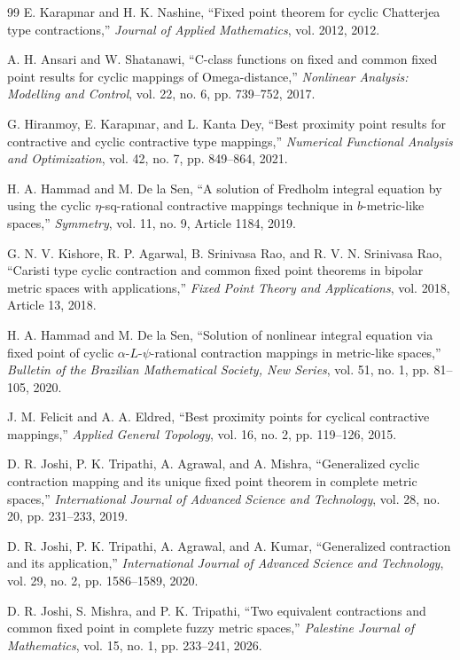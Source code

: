 \documentclass[11pt,a4paper,margin=1in]{amsart}
\theoremstyle{plain}
\theoremstyle{definition}
\theoremstyle{remark}
\begin{document}
\begin{thebibliography}{99}
E. Karapınar and H. K. Nashine,
``Fixed point theorem for cyclic Chatterjea type contractions,''
\emph{Journal of Applied Mathematics}, vol. 2012, 2012.

A. H. Ansari and W. Shatanawi,
``C-class functions on fixed and common fixed point results for cyclic mappings
of Omega-distance,''
\emph{Nonlinear Analysis: Modelling and Control}, vol. 22, no. 6,
pp. 739--752, 2017.

G. Hiranmoy, E. Karapınar, and L. Kanta Dey,
``Best proximity point results for contractive and cyclic contractive type mappings,''
\emph{Numerical Functional Analysis and Optimization}, vol. 42, no. 7,
pp. 849--864, 2021.

H. A. Hammad and M. De la Sen,
``A solution of Fredholm integral equation by using the cyclic
$\eta$-sq-rational contractive mappings technique in $b$-metric-like spaces,''
\emph{Symmetry}, vol. 11, no. 9, Article 1184, 2019.

G. N. V. Kishore, R. P. Agarwal, B. Srinivasa Rao, and R. V. N. Srinivasa Rao,
``Caristi type cyclic contraction and common fixed point theorems in bipolar
metric spaces with applications,''
\emph{Fixed Point Theory and Applications}, vol. 2018,
Article 13, 2018.

H. A. Hammad and M. De la Sen,
``Solution of nonlinear integral equation via fixed point of cyclic
$\alpha$-$L$-$\psi$-rational contraction mappings in metric-like spaces,''
\emph{Bulletin of the Brazilian Mathematical Society, New Series},
vol. 51, no. 1, pp. 81--105, 2020.

J. M. Felicit and A. A. Eldred,
``Best proximity points for cyclical contractive mappings,''
\emph{Applied General Topology}, vol. 16, no. 2,
pp. 119--126, 2015.

D. R. Joshi, P. K. Tripathi, A. Agrawal, and A. Mishra,
``Generalized cyclic contraction mapping and its unique fixed point theorem
in complete metric spaces,''
\emph{International Journal of Advanced Science and Technology},
vol. 28, no. 20, pp. 231--233, 2019.

D. R. Joshi, P. K. Tripathi, A. Agrawal, and A. Kumar,
``Generalized contraction and its application,''
\emph{International Journal of Advanced Science and Technology},
vol. 29, no. 2, pp. 1586--1589, 2020.

D. R. Joshi, S. Mishra, and P. K. Tripathi,
``Two equivalent contractions and common fixed point in complete fuzzy metric spaces,''
\emph{Palestine Journal of Mathematics}, vol. 15, no. 1,
pp. 233--241, 2026.


\end{thebibliography}
\end{document}
